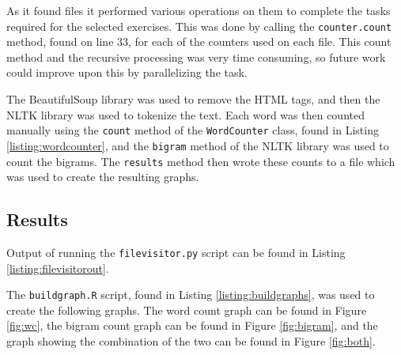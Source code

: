 As it found files it performed various operations on them to complete the tasks required for the selected exercises.  This was done by calling the \texttt{counter.count} method, found on line 33, for each of the counters used on each file.  This count method and the recursive processing was very time consuming, so future work could improve upon this by parallelizing the task.

The BeautifulSoup library \cite{py:beautifulsoup} was used to remove the HTML tags, and then the NLTK library \cite{py:nltk} was used to tokenize the text.  Each word was then counted manually using the \texttt{count} method of the \texttt{WordCounter} class, found in Listing \ref{listing:wordcounter}, and the \texttt{bigram} method of the NLTK library \cite{py:nltk} was used to count the bigrams.  The \texttt{results} method then wrote these counts to a file which was used to create the resulting graphs.



\clearpage

\subsection{Results}
Output of running the \texttt{filevisitor.py} script can be found in Listing \ref{listing:filevisitorout}.




The \texttt{buildgraph.R} script, found in Listing \ref{listing:buildgraphs}, was used to create the following graphs.  The word count graph can be found in Figure \ref{fig:wc}, the bigram count graph can be found in Figure \ref{fig:bigram}, and the graph showing the combination of the two can be found in Figure \ref{fig:both}.

